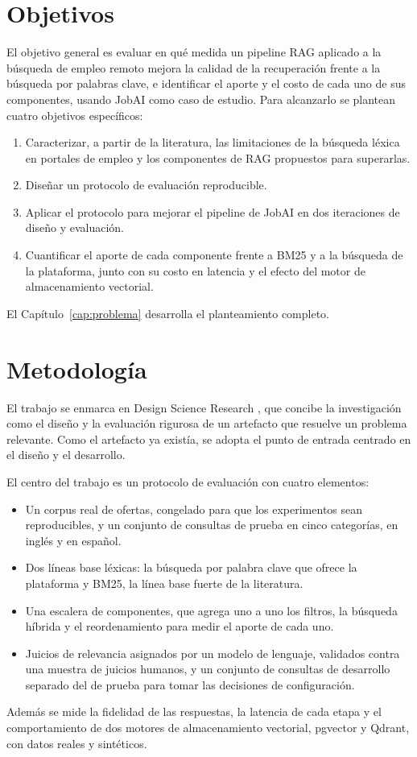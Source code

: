 \section*{Objetivos}

El objetivo general es evaluar en qué medida un pipeline RAG aplicado a la búsqueda de empleo remoto mejora la calidad de la recuperación frente a la búsqueda por palabras clave, e identificar el aporte y el costo de cada uno de sus componentes, usando JobAI como caso de estudio. Para alcanzarlo se plantean cuatro objetivos específicos:
\begin{enumerate}
    \item Caracterizar, a partir de la literatura, las limitaciones de la búsqueda léxica en portales de empleo y los componentes de RAG propuestos para superarlas.
    \item Diseñar un protocolo de evaluación reproducible.
    \item Aplicar el protocolo para mejorar el pipeline de JobAI en dos iteraciones de diseño y evaluación.
    \item Cuantificar el aporte de cada componente frente a BM25 y a la búsqueda de la plataforma, junto con su costo en latencia y el efecto del motor de almacenamiento vectorial.
\end{enumerate}
El Capítulo~\ref{cap:problema} desarrolla el planteamiento completo.

\section*{Metodología}

El trabajo se enmarca en Design Science Research \citep{Hevner2004,Peffers2007}, que concibe la investigación como el diseño y la evaluación rigurosa de un artefacto que resuelve un problema relevante. Como el artefacto ya existía, se adopta el punto de entrada centrado en el diseño y el desarrollo.

El centro del trabajo es un protocolo de evaluación con cuatro elementos:
\begin{itemize}
    \item Un corpus real de ofertas, congelado para que los experimentos sean reproducibles, y un conjunto de consultas de prueba en cinco categorías, en inglés y en español.
    \item Dos líneas base léxicas: la búsqueda por palabra clave que ofrece la plataforma y BM25, la línea base fuerte de la literatura.
    \item Una escalera de componentes, que agrega uno a uno los filtros, la búsqueda híbrida y el reordenamiento para medir el aporte de cada uno.
    \item Juicios de relevancia asignados por un modelo de lenguaje, validados contra una muestra de juicios humanos, y un conjunto de consultas de desarrollo separado del de prueba para tomar las decisiones de configuración.
\end{itemize}
Además se mide la fidelidad de las respuestas, la latencia de cada etapa y el comportamiento de dos motores de almacenamiento vectorial, pgvector y Qdrant, con datos reales y sintéticos.

